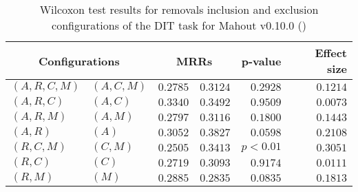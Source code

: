
\begin{table}
\begin{spacing}{1.2}
\centering
\caption{Wilcoxon test results for removals inclusion and exclusion configurations of the DIT task for Mahout v0.10.0 (\ctwo)}
\label{table:versus-wilcox-mahout-dit-removals}
\begin{tabular}{ll|rr|rr}
\toprule
      \multicolumn{2}{c|}{Configurations} &                \multicolumn{2}{c|}{MRRs} &             p-value & Effect size \\
\midrule
 $(A,R,C,M)$ &  $(A,C,M)$ &       $0.2785$ &  $\bm{0.3124}$ & $0.2928$ &    $0.1214$ \\
   $(A,R,C)$ &    $(A,C)$ &       $0.3340$ &  $\bm{0.3492}$ & $0.9509$ &    $0.0073$ \\
   $(A,R,M)$ &    $(A,M)$ &       $0.2797$ &  $\bm{0.3116}$ & $0.1800$ &    $0.1443$ \\
     $(A,R)$ &      $(A)$ &       $0.3052$ &  $\bm{0.3827}$ & $0.0598$ &    $0.2108$ \\
   $(R,C,M)$ &    $(C,M)$ &       $0.2505$ &  $\bm{0.3413}$ & $p<0.01$ &    $0.3051$ \\
     $(R,C)$ &      $(C)$ &       $0.2719$ &  $\bm{0.3093}$ & $0.9174$ &    $0.0111$ \\
     $(R,M)$ &      $(M)$ &  $\bm{0.2885}$ &       $0.2835$ & $0.0835$ &    $0.1813$ \\
\bottomrule
\end{tabular}

\end{spacing}
\end{table}

